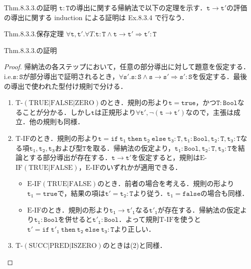 \documentclass[9pt]{beamer}
\begin{document}
\begin{frame}{Thm.8.3.3.の証明}
$\mathtt{t:T}$の導出に関する帰納法で以下の定理を示す．$\mathtt{t\rightarrow t'}$の評価の導出に関する induction による証明は Ex.8.3.4 で行なう．
\begin{dblock}{Thm.8.3.3.保存定理}
	$\forall \mathtt{t,t'}.\forall{T}.\mathtt{t:T\land t\rightarrow t'}\Rightarrow \mathtt{t':T}$
\end{dblock}
\end{frame}\begin{frame}{Thm.8.3.3.の証明}
\begin{proof}
帰納法の各ステップにおいて，任意の部分導出に対して題意を仮定する．i.e.$\mathtt{s:S}$が部分導出で証明されるとき，$\forall \mathtt{s'. s:S\land s\rightarrow s'\Rightarrow s':S}$を仮定する．最後の導出で使われた型付け規則で分ける．\begin{enumerate}
	\item $\mathrm{T}$-$\mathrm{(TRUE|FALSE|ZERO)}$のとき．規則の形より$\mathtt{t = true}$，かつ$\mathtt{T:Bool}$なることが分かる．しかし$\mathtt{t}$は正規形より$\mathtt{\forall t', \neg(t\rightarrow t')}$なので，主張は成立．他の規則も同様．
	\item $\mathrm{T}$-$\mathrm{IF}$のとき．規則の形より$\mathtt{t = if \ t_{1}\ then\ t_{2}\ else\ t_{3}:T, t_{1}:Bool, t_{2}:T, t_{3}:T}$なる項$\mathtt{t_{1}, t_{2}, t_{3}}$および型$\mathtt{T}$を取る．帰納法の仮定より，$\mathtt{t_{1}:Bool, t_{2}:T, t_{3}:T}$を結論とする部分導出が存在する．$\mathtt{t\rightarrow t'}$を仮定すると，規則は$\mathrm{E}$-$\mathrm{IF(TRUE|FALSE)}$，$\mathrm{E}$-$\mathrm{IF}$のいずれかが適用できる．\begin{itemize}
	\item $\mathrm{E}$-$\mathrm{IF(TRUE|FALSE)}$のとき．前者の場合を考える．規則の形より$\mathtt{t_{1} = true}$で，結果の項は$\mathtt{t' = t_{2}:T}$より従う．$\mathtt{t_{1}= false}$の場合も同様．
	\item $\mathrm{E}$-$\mathrm{IF}$のとき．規則の形より$\mathtt{t_{1}\rightarrow t'_{1}}$なる$\mathtt{t'_{1}}$が存在する．帰納法の仮定より$\mathtt{t_{1}:Bool}$を併せると$\mathtt{t'_{1}:Bool}$．よって規則$\mathrm{T}$-$\mathrm{IF}$を使うと$\mathtt{t' = if\ t'_{1}\ then\ t_{2}\ else\ t_{3}:T}$より正しい．
	\end{itemize}
	\item $\mathrm{T}$-$\mathrm{(SUCC|PRED|ISZERO)}$のときは(2)と同様．
\end{enumerate}
\end{proof}
\end{frame}
\end{document}
